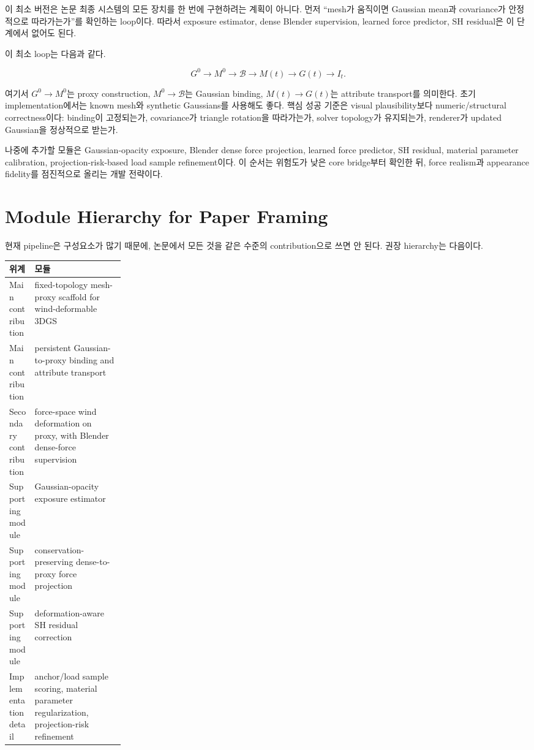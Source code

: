 \documentclass[11pt,a4paper]{article}
\begin{document}
이 최소 버전은 논문 최종 시스템의 모든 장치를 한 번에 구현하려는 계획이 아니다.
먼저 ``mesh가 움직이면 Gaussian mean과 covariance가 안정적으로 따라가는가''를 확인하는 loop이다.
따라서 exposure estimator, dense Blender supervision, learned force predictor, SH residual은 이 단계에서 없어도 된다.

이 최소 loop는 다음과 같다.

\begin{equation}
G^0\rightarrow M^0\rightarrow \mathcal{B}\rightarrow M(t)\rightarrow G(t)\rightarrow I_t.
\end{equation}

여기서 $G^0\rightarrow M^0$는 proxy construction, $M^0\rightarrow\mathcal{B}$는 Gaussian binding, $M(t)\rightarrow G(t)$는 attribute transport를 의미한다.
초기 implementation에서는 known mesh와 synthetic Gaussians를 사용해도 좋다.
핵심 성공 기준은 visual plausibility보다 numeric/structural correctness이다: binding이 고정되는가, covariance가 triangle rotation을 따라가는가, solver topology가 유지되는가, renderer가 updated Gaussian을 정상적으로 받는가.

나중에 추가할 모듈은 Gaussian-opacity exposure, Blender dense force projection, learned force predictor, SH residual, material parameter calibration, projection-risk-based load sample refinement이다.
이 순서는 위험도가 낮은 core bridge부터 확인한 뒤, force realism과 appearance fidelity를 점진적으로 올리는 개발 전략이다.

\section{Module Hierarchy for Paper Framing}

현재 pipeline은 구성요소가 많기 때문에, 논문에서 모든 것을 같은 수준의 contribution으로 쓰면 안 된다. 권장 hierarchy는 다음이다.

\begin{center}
\begin{tabularx}{0.96\linewidth}{L{0.22\linewidth}Y}
\toprule
위계 & 모듈 \\
\midrule
Main contribution & fixed-topology mesh-proxy scaffold for wind-deformable 3DGS \\
Main contribution & persistent Gaussian-to-proxy binding and attribute transport \\
Secondary contribution & force-space wind deformation on proxy, with Blender dense-force supervision \\
Supporting module & Gaussian-opacity exposure estimator \\
Supporting module & conservation-preserving dense-to-proxy force projection \\
Supporting module & deformation-aware SH residual correction \\
Implementation detail & anchor/load sample scoring, material parameter regularization, projection-risk refinement \\
\bottomrule
\end{tabularx}
\end{center}
\end{document}

